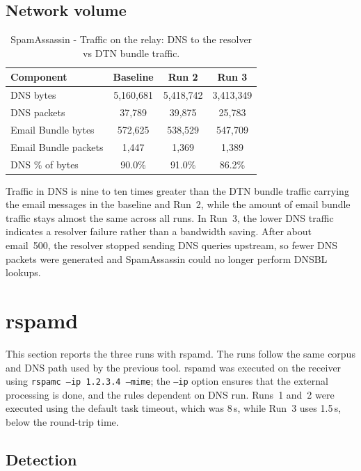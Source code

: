 \subsection{Network volume}

\begin{table}[H]\centering
\small
\begin{tabular}{@{}lccc@{}}
\toprule
Component & Baseline & Run 2 & Run 3 \\
\midrule
DNS bytes       & 5{,}160{,}681 & 5{,}418{,}742 & 3{,}413{,}349 \\
DNS packets     & 37{,}789 & 39{,}875 & 25{,}783 \\
Email Bundle bytes    & 572{,}625 & 538{,}529 & 547{,}709 \\
Email Bundle packets  & 1{,}447 & 1{,}369 & 1{,}389 \\
DNS \% of bytes & 90.0\% & 91.0\% & 86.2\% \\
\bottomrule
\end{tabular}
\caption{SpamAssassin - Traffic on the relay: DNS to the resolver vs DTN bundle traffic.}
\label{tab:sa-bw}
\end{table}

Traffic in DNS is nine to ten times greater than the DTN bundle traffic carrying
the email messages in the baseline and Run~2, while the amount of
email bundle traffic stays almost the same across all runs. In Run~3, the lower
DNS traffic indicates a resolver failure rather than a bandwidth saving. After
about email~500, the resolver stopped sending DNS queries upstream, so fewer
DNS packets were generated and SpamAssassin could no longer perform DNSBL
lookups.

\section{rspamd}

This section reports the three runs with rspamd. The runs follow the same corpus and DNS path used by the previous tool. rspamd was executed on the
receiver using \texttt{rspamc --ip 1.2.3.4 --mime}; the \texttt{--ip} option ensures that the external processing is done, and the rules dependent on DNS run. Runs~1
and~2 were executed using the default task timeout, which was 8\,s,
while Run~3 uses 1.5\,s, below the round-trip time.

\subsection{Detection}

